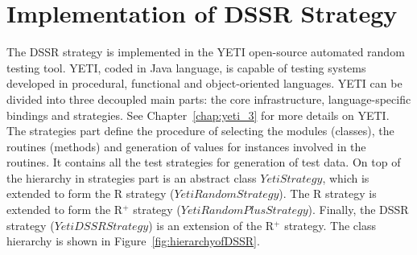 

\section{Implementation of DSSR Strategy}\label{sec:imp}

The DSSR strategy is implemented in the YETI open-source automated random testing tool. YETI, coded in Java language, is capable of testing systems developed in procedural, functional and object-oriented languages.
YETI can be divided into three decoupled main parts: the core infrastructure, language-specific bindings and strategies. See Chapter~\ref{chap:yeti_3} for more details on YETI. 
The strategies part define the procedure of selecting the modules (classes), the routines (methods) and generation of values for instances involved in the routines. It contains all the test strategies for generation of test data. On top of the hierarchy in strategies part is an abstract class $YetiStrategy$, which is extended to form the R strategy ($YetiRandomStrategy$). The R strategy is extended to form the R$^+$ strategy ($YetiRandomPlusStrategy$). Finally, the DSSR strategy ($YetiDSSRStrategy$) is an extension of the R$^+$ strategy. The class hierarchy is shown in Figure~\ref{fig:hierarchyofDSSR}.


